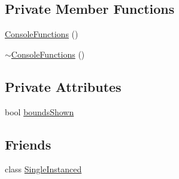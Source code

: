 \subsection*{Private Member Functions}
\begin{DoxyCompactItemize}
\item 
\hyperlink{classZeta_1_1ConsoleFunctions_aa5761a2b11813db1f409d4a6d0bf8f00}{Console\+Functions} ()
\item 
\hyperlink{classZeta_1_1ConsoleFunctions_a265e553e278a678d11d51c08942554b6}{$\sim$\+Console\+Functions} ()
\end{DoxyCompactItemize}
\subsection*{Private Attributes}
\begin{DoxyCompactItemize}
\item 
bool \hyperlink{classZeta_1_1ConsoleFunctions_ab493f2acca519714be35b1f821d21422}{bounds\+Shown}
\end{DoxyCompactItemize}
\subsection*{Friends}
\begin{DoxyCompactItemize}
\item 
class \hyperlink{classZeta_1_1ConsoleFunctions_a2fa95d69b32a77fffa4b730679a8b08c}{Single\+Instanced}
\end{DoxyCompactItemize}


